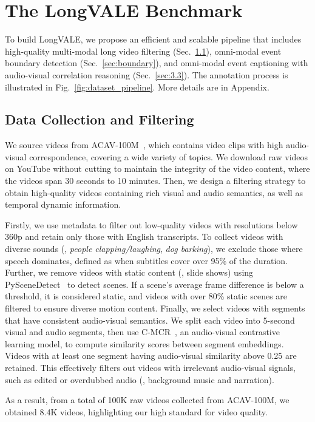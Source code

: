 \section{The LongVALE Benchmark}
To build LongVALE, we propose an efficient and scalable pipeline that includes high-quality multi-modal long video filtering (Sec.~\ref{sec:filter}), omni-modal event boundary detection (Sec.~\ref{sec:boundary}), and omni-modal event captioning with audio-visual correlation reasoning (Sec.~\ref{sec:3.3}). 
The annotation process is illustrated in Fig.~\ref{fig:dataset_pipeline}.
{\color{black}More details are in Appendix.}


\subsection{Data Collection and Filtering}
\label{sec:filter}
We source videos from ACAV-100M~\cite{lee2021acav100m}, which contains video clips with high audio-visual correspondence, covering a wide variety of topics. 
We download raw videos on YouTube without cutting to maintain the integrity of the video content, where the videos span 30 seconds to 10 minutes. 
Then, we design a filtering strategy to obtain high-quality videos containing rich visual and audio semantics, as well as temporal dynamic information. 

Firstly, we use metadata to filter out low-quality videos with resolutions below 360p and retain only those with English transcripts.
To collect videos with diverse sounds (\eg, \textit{people clapping/laughing}, \textit{dog barking}), we exclude those where speech dominates, defined as when subtitles cover over 95\% of the duration.
Further, we remove videos with static content (\ie, slide shows) using PySceneDetect~\cite{Pyscenedetect} to detect scenes.
If a scene's average frame difference is below a threshold, it is considered static, and videos with over 80\% static scenes are filtered to ensure diverse motion content.
Finally, we select videos with segments that have consistent audio-visual semantics. 
We split each video into 5-second visual and audio segments, then use C-MCR~\cite{wang2023connecting}, an audio-visual contrastive learning model, to compute similarity scores between segment embeddings. Videos with at least one segment having audio-visual similarity above 0.25 are retained.
This effectively filters out videos with irrelevant audio-visual signals, such as edited or overdubbed audio (\eg, background music and narration).

As a result, from a total of 100K raw videos collected from ACAV-100M, we obtained 8.4K videos, highlighting our high standard for video quality.

